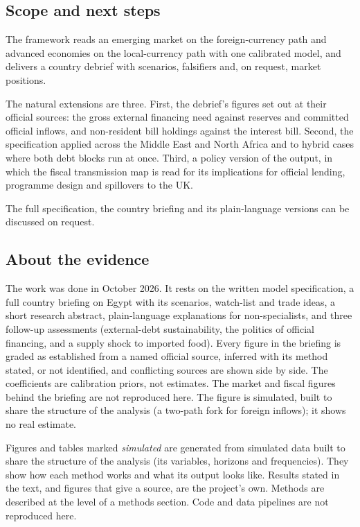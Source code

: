 \documentclass[
  british,
  a4paper,
]{article}
\begin{document}
\subsection{Scope and next steps}\label{scope-and-next-steps}

The framework reads an emerging market on the foreign-currency path and
advanced economies on the local-currency path with one calibrated model,
and delivers a country debrief with scenarios, falsifiers and, on
request, market positions.

The natural extensions are three. First, the debrief's figures set out
at their official sources: the gross external financing need against
reserves and committed official inflows, and non-resident bill holdings
against the interest bill. Second, the specification applied across the
Middle East and North Africa and to hybrid cases where both debt blocks
run at once. Third, a policy version of the output, in which the fiscal
transmission map is read for its implications for official lending,
programme design and spillovers to the UK.

The full specification, the country briefing and its plain-language
versions can be discussed on request.

\subsection{About the evidence}\label{about-the-evidence}

The work was done in October 2026. It rests on the written model
specification, a full country briefing on Egypt with its scenarios,
watch-list and trade ideas, a short research abstract, plain-language
explanations for non-specialists, and three follow-up assessments
(external-debt sustainability, the politics of official financing, and a
supply shock to imported food). Every figure in the briefing is graded
as established from a named official source, inferred with its method
stated, or not identified, and conflicting sources are shown side by
side. The coefficients are calibration priors, not estimates. The market
and fiscal figures behind the briefing are not reproduced here. The
figure is simulated, built to share the structure of the analysis (a
two-path fork for foreign inflows); it shows no real estimate.

Figures and tables marked \emph{simulated} are generated from simulated
data built to share the structure of the analysis (its variables,
horizons and frequencies). They show how each method works and what its
output looks like. Results stated in the text, and figures that give a
source, are the project's own. Methods are described at the level of a
methods section. Code and data pipelines are not reproduced here.
\end{document}
